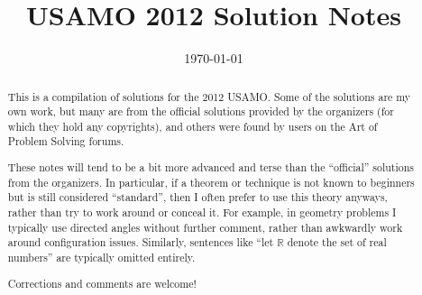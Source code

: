 \documentclass[11pt]{scrartcl}
\title{USAMO 2012 Solution Notes}
\date{\today}
\begin{document}
\maketitle

\begin{abstract}
This is a compilation of solutions
for the 2012 USAMO.
Some of the solutions are my own work,
but many are from the official solutions provided by the organizers
(for which they hold any copyrights),
and others were found by users on the Art of Problem Solving forums.

These notes will tend to be a bit more advanced and terse than the ``official''
solutions from the organizers.
In particular, if a theorem or technique is not known to beginners
but is still considered ``standard'', then I often prefer to
use this theory anyways, rather than try to work around or conceal it.
For example, in geometry problems I typically use directed angles
without further comment, rather than awkwardly work around configuration issues.
Similarly, sentences like ``let $\mathbb{R}$ denote the set of real numbers''
are typically omitted entirely.

Corrections and comments are welcome!
\end{abstract}

\tableofcontents
\newpage

\addtocounter{section}{-1}
\end{document}
